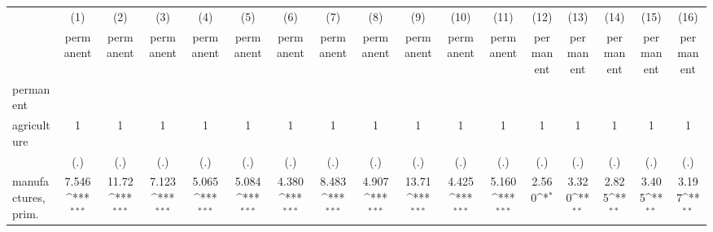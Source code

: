 {
\def\sym#1{\ifmmode^{#1}\else\(^{#1}\)\fi}
\begin{tabular}{l*{16}{c}}
\hline\hline
                    &\multicolumn{1}{c}{(1)}&\multicolumn{1}{c}{(2)}&\multicolumn{1}{c}{(3)}&\multicolumn{1}{c}{(4)}&\multicolumn{1}{c}{(5)}&\multicolumn{1}{c}{(6)}&\multicolumn{1}{c}{(7)}&\multicolumn{1}{c}{(8)}&\multicolumn{1}{c}{(9)}&\multicolumn{1}{c}{(10)}&\multicolumn{1}{c}{(11)}&\multicolumn{1}{c}{(12)}&\multicolumn{1}{c}{(13)}&\multicolumn{1}{c}{(14)}&\multicolumn{1}{c}{(15)}&\multicolumn{1}{c}{(16)}\\
                    &\multicolumn{1}{c}{permanent}&\multicolumn{1}{c}{permanent}&\multicolumn{1}{c}{permanent}&\multicolumn{1}{c}{permanent}&\multicolumn{1}{c}{permanent}&\multicolumn{1}{c}{permanent}&\multicolumn{1}{c}{permanent}&\multicolumn{1}{c}{permanent}&\multicolumn{1}{c}{permanent}&\multicolumn{1}{c}{permanent}&\multicolumn{1}{c}{permanent}&\multicolumn{1}{c}{permanent}&\multicolumn{1}{c}{permanent}&\multicolumn{1}{c}{permanent}&\multicolumn{1}{c}{permanent}&\multicolumn{1}{c}{permanent}\\
\hline
permanent           &                     &                     &                     &                     &                     &                     &                     &                     &                     &                     &                     &                     &                     &                     &                     &                     \\
agriculture         &           1         &           1         &           1         &           1         &           1         &           1         &           1         &           1         &           1         &           1         &           1         &           1         &           1         &           1         &           1         &           1         \\
                    &         (.)         &         (.)         &         (.)         &         (.)         &         (.)         &         (.)         &         (.)         &         (.)         &         (.)         &         (.)         &         (.)         &         (.)         &         (.)         &         (.)         &         (.)         &         (.)         \\
[1em]
manufactures, prim. &       7.546\sym{***}&       11.72\sym{***}&       7.123\sym{***}&       5.065\sym{***}&       5.084\sym{***}&       4.380\sym{***}&       8.483\sym{***}&       4.907\sym{***}&       13.71\sym{***}&       4.425\sym{***}&       5.160\sym{***}&       2.560\sym{*}  &       3.320\sym{**} &       2.825\sym{**} &       3.405\sym{**} &       3.197\sym{**} \\

\end{tabular}}

